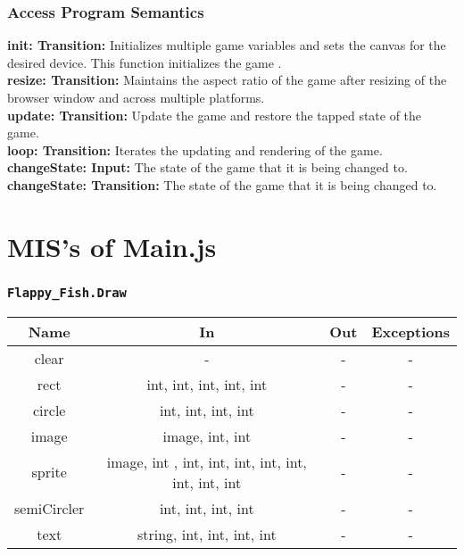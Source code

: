 \documentclass[11pt, oneside]{article}   	%
\begin{document}
\subsubsection*{Access Program Semantics} 
 \textbf{init: Transition: } Initializes multiple game variables and sets the canvas for the desired device.     This function initializes the game .\\
 \textbf{resize: Transition:} Maintains the aspect ratio of the game after resizing of the browser window and across multiple platforms.\\
  \textbf{update: Transition:} Update the game and restore the tapped state of the game.\\
   \textbf{loop: Transition:} Iterates the updating and rendering of the game. \\
    \textbf{changeState: Input:} The state of the game that it is being changed to. \\
    \textbf{changeState: Transition:} The state of the game that it is being changed to. \\

 
 
\section*{MIS's of Main.js}
\subsubsection*{\texttt{Flappy\_Fish.Draw}}



\begin{center}
\begin{tabular}{ |c|c|c|c| } 
 \hline
 Name & In & Out & Exceptions \\ 
 \hline \hline
 clear & - & - & - \\ 
 rect & int, int, int, int, int & - & - \\ 
 circle & int, int, int, int & - & - \\ 
 image & image, int, int & - & - \\ 
 sprite & image, int , int, int, int, int, int, int, int, int & - & - \\ 
 semiCircler & int, int, int, int & - & - \\ 
 text & string, int, int, int, int & - & - \\ 
 \hline
\end{tabular}
\end{center}
\end{document}
